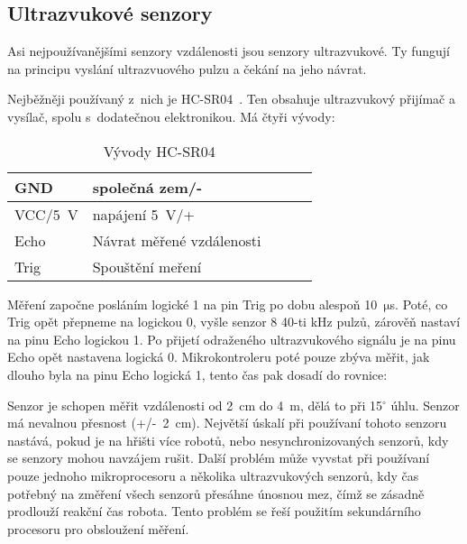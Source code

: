 \subsection{Ultrazvukové senzory}

Asi nejpoužívanějšími senzory vzdálenosti jsou senzory ultrazvukové.
Ty fungují na principu vyslání ultrazvuového pulzu a čekání na jeho návrat.

Nejběžněji používaný z~nich je HC-SR04~\cite{hc-sr04}. 
Ten obsahuje ultrazvukový přijímač a vysílač, spolu s~dodatečnou elektronikou.
Má čtyři vývody: 
\begin{table}[h]
	
	\centering
	\begin{tabular}{|l|l|l|l|l|} \hline
		GND & společná zem/-   \\ \hline
		VCC/5~V & napájení 5~V/+  \\ \hline
		Echo & Návrat měřené vzdálenosti   \\ \hline
		Trig & Spouštění meření \\ \hline
    \end{tabular}
    \caption{Vývody HC-SR04}
\end{table}

Měření započne posláním logické 1 na pin Trig po dobu alespoň 10~$\mathrm{\mu}$s.
Poté, co Trig opět přepneme na logickou 0, vyšle senzor 8 40-ti kHz pulzů, zárověň nastaví na pinu Echo logickou 1.
Po přijetí odraženého ultrazvukového signálu je na pinu Echo opět nastavena logická 0.
Mikrokontroleru poté pouze zbýva měřit, jak dlouho byla na pinu Echo logická 1, tento čas pak dosadí do rovnice:
    
    
Senzor je schopen měřit vzdálenosti od 2~cm do 4~m, dělá to při 15$^{\circ}$ úhlu.
Senzor má nevalnou přesnost (+/-~2~cm).
Největší úskalí při používaní tohoto senzoru nastává, pokud je na hřišti více robotů, nebo nesynchronizovaných senzorů, kdy se senzory mohou navzájem rušit.
Další problém může vyvstat při používaní pouze jednoho mikroprocesoru a několika ultrazvukových senzorů, kdy čas potřebný na změření všech senzorů přesáhne únosnou mez, čímž se zásadně prodlouží reakční čas robota.
Tento problém se řeší použitím sekundárního procesoru pro obsloužení měření.


